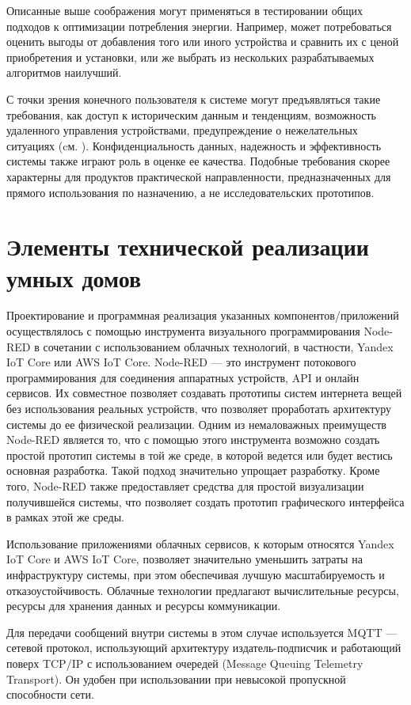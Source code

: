 Описанные выше соображения могут применяться в тестировании общих подходов к оптимизации потребления энергии. Например, может потребоваться оценить выгоды от добавления того или иного устройства и сравнить их с ценой приобретения и установки, или же выбрать из нескольких разрабатываемых алгоритмов наилучший.

С точки зрения конечного пользователя к системе могут предъявляться такие требования, как доступ к историческим данным и тенденциям, возможность удаленного управления устройствами, предупреждение о нежелательных ситуациях  (cм. ). Конфиденциальность данных, надежность и эффективность системы также играют роль в оценке ее качества. Подобные требования скорее характерны для продуктов практической направленности, предназначенных для прямого использования по назначению, а не исследовательских прототипов.

\section{Элементы технической реализации умных домов}
\label{sec_SH_tec_impl}
Проектирование и программная реализация указанных компонентов/приложений осуществлялось с помощью инструмента  визуального программирования Node-RED  в сочетании с использованием облачных технологий, в частности, Yandex IoT Core  или AWS IoT Core. Node-RED  — это инструмент потокового программирования для соединения аппаратных устройств, API и онлайн сервисов. Их совместное позволяет создавать прототипы систем интернета вещей без использования реальных устройств, что позволяет проработать архитектуру системы до ее физической реализации.  Одним из немаловажных преимуществ Node-RED является то, что с помощью этого инструмента возможно создать простой прототип системы в той же среде, в которой ведется или будет вестись основная разработка. Такой подход значительно упрощает разработку. Кроме того, Node-RED также предоставляет средства для простой визуализации получившейся системы, что позволяет создать прототип графического интерфейса в рамках этой же среды.

Использование приложениями облачных сервисов, к которым относятся Yandex IoT Core  и AWS IoT Core, позволяет значительно уменьшить затраты на инфраструктуру системы, при этом обеспечивая лучшую масштабируемость и отказоустойчивость. Облачные технологии предлагают вычислительные ресурсы, ресурсы для хранения данных и ресурсы коммуникации.

Для передачи сообщений внутри системы в этом случае используется MQTT   — сетевой протокол, использующий архитектуру издатель-подписчик и работающий поверх TCP/IP с использованием очередей (Message Queuing Telemetry Transport). Он удобен при использовании при невысокой  пропускной способности сети.

